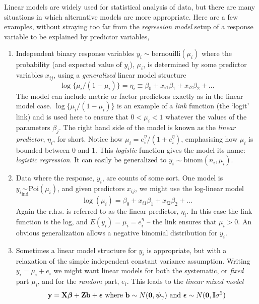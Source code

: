 \documentclass[10pt] {article}
\newcommand{\bp}{{\vm \beta}}
\newcommand{\X}{{\vf X}}
\newcommand{\vf}{\bf} %
\newcommand{\vm}{\bm} %
\theoremstyle{definition}
\begin{document}
Linear models are widely used for statistical analysis of data, but there are many situations in which alternative models are more appropriate. Here are a few examples, without straying too far from the {\em regression model} setup of a response variable to be explained by predictor variables,
\begin{enumerate}
\item Independent binary response variables $y_i \sim \text{bernouilli}(\mu_i)$ where the probability (and expected value of $y_i$), $\mu_i$, is determined by some predictor variables $x_{ij}$, using a {\em generalized} linear model structure
$$
\log\{\mu_i/(1-\mu_i)\} = \eta_i \equiv \beta_0 + x_{i1}\beta_1 + x_{i2} \beta_2 + \ldots
$$
The model can include metric or factor predictors exactly as in the linear model case. $\log\{\mu_i/(1-\mu_i)\}$ is an example of a {\em link} function (the `logit' link) and is used here to ensure that $0<\mu_i<1$ whatever the values of the parameters $\beta_j$. The right hand side of the model is known as the {\em linear predictor}, $\eta_i$, for short. Notice how $\mu_i = e^\eta_i/(1+e^\eta_i)$, emphasising how $\mu_i$ is bounded between 0 and 1. This {\em logistic} function gives the model its name: {\em logistic regression}. It can easily be generalized to $y_i \sim \text{binom}(n_i,\mu_i)$.  
\item Data where the response, $y_i$, are counts of some sort. One model is $y_i \underset{\text{ind}}{\sim} \text{Poi}(\mu_i)$, and given predictors $x_{ij}$, we might use the log-linear model 
$$
\log(\mu_i) = \beta_0 + x_{i1}\beta_1 + x_{i2} \beta_2 + \ldots
$$ 
Again the r.h.s. is referred to as the linear predictor, $\eta_i$. In this case the link function is the log, and $E(y_i) = \mu_i = e^\eta_i$ -- the link ensures that $\mu_i > 0$. An obvious generalization allows a negative binomial distribution for $y_i$.
\item Sometimes a linear model structure for $y_i$ is appropriate, but with a relaxation of the simple independent constant variance assumption. Writing $y_i = \mu_i + e_i$ we might want linear models for both the systematic, or {\em fixed} part $\mu_i$, and for the {\em random} part, $e_i$. This leads to the {\em linear mixed model}
$$
{\bf y} = \X \bp + {\bf Zb} + {\bm \epsilon} \text{  where  } {\bf b} \sim N({\bf 0}, {\bm \psi}_{\gamma}) \text{  and  } {\bm \epsilon} \sim N({\bf 0}, {\bf I}\sigma^2)
$$  

\end{enumerate}
\end{document}

